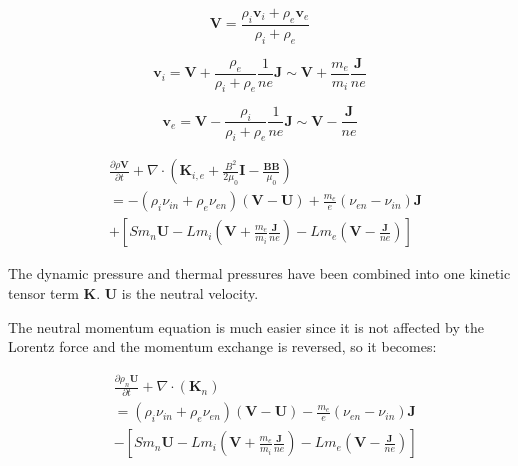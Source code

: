 \documentclass[12pt,upcase]{umlthesis}
\begin{document}
\begin{equation}
	\textbf{V} = \frac{\rho_i \textbf{v}_i + \rho_e \textbf{v}_e}{\rho_i+\rho_e}
\end{equation}

\begin{equation}\label{eq:vi}
	\textbf{v}_i = \textbf{V} + \frac{\rho_e}{\rho_i+\rho_e} \frac{1}{n e} \textbf{J} \sim \textbf{V} + \frac{m_e}{m_i} \frac{\textbf{J}}{n e} 
\end{equation}

\begin{equation}\label{eq:ve}
	\textbf{v}_e = \textbf{V} - \frac{\rho_i}{\rho_i+\rho_e} \frac{1}{n e} \textbf{J} \sim \textbf{V} -\frac{\textbf{J} }{n e}
\end{equation}

\begin{equation}\label{eq:momentumcom}
\begin{aligned}
	&\frac{\partial \rho \textbf{V}}{\partial t} + \nabla \cdot (\textbf{K}_{i,e} + \frac{B^2}{2\mu_0}\textbf{I} - \frac{\textbf{BB}}{\mu_0}) \\
	&= - (\rho_i \nu_{in} + \rho_e \nu_{en})(\textbf{V} - \textbf{U}) + \frac{m_e}{e}(\nu_{en}-\nu_{in}) \textbf{J} \\
	& + [S m_n \textbf{U} - L m_i (\textbf{V} + \frac{m_e}{m_i} \frac{\textbf{J}}{n e})- L m_e (\textbf{V} -\frac{\textbf{J}}{n e})]
\end{aligned}
\end{equation}

The dynamic pressure and thermal pressures have been combined into one kinetic tensor term $\textbf{K}$. $\textbf{U}$ is the neutral velocity.

The neutral momentum equation is much easier since it is not affected by the Lorentz force and the momentum exchange is reversed, so it becomes:

\begin{equation}\label{eq:momentumneutral}
\begin{aligned}
	&\frac{\partial \rho_n \textbf{U}}{\partial t} + \nabla \cdot (\textbf{K}_n) \\
	&= (\rho_i \nu_{in} + \rho_e \nu_{en})(\textbf{V} - \textbf{U}) - \frac{m_e}{e}(\nu_{en}-\nu_{in}) \textbf{J} \\
	& - [S m_n \textbf{U} - L m_i (\textbf{V} + \frac{m_e}{m_i} \frac{\textbf{J}}{n e})- L m_e (\textbf{V} -\frac{\textbf{J}}{n e})]
\end{aligned}
\end{equation}
\end{document}

